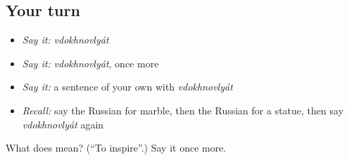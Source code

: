 \subsection*{Your turn}
\begin{itemize}
\raggedright
  \item \emph{Say it:} \emph{vdokhnovlyát}
  \item \emph{Say it:} \emph{vdokhnovlyát}, once more
  \item \emph{Say it:} a sentence of your own with \emph{vdokhnovlyát}
  \item \emph{Recall:} say the Russian for marble, then the Russian for a statue, then say \emph{vdokhnovlyát} again
\end{itemize}

\begin{tcolorbox}[breakable,colback=teal!4,colframe=teal!35!black,title={Before you move on}]
What does  mean? (\textquotedblleft{}To inspire\textquotedblright{}.) Say it once more.
\end{tcolorbox}
